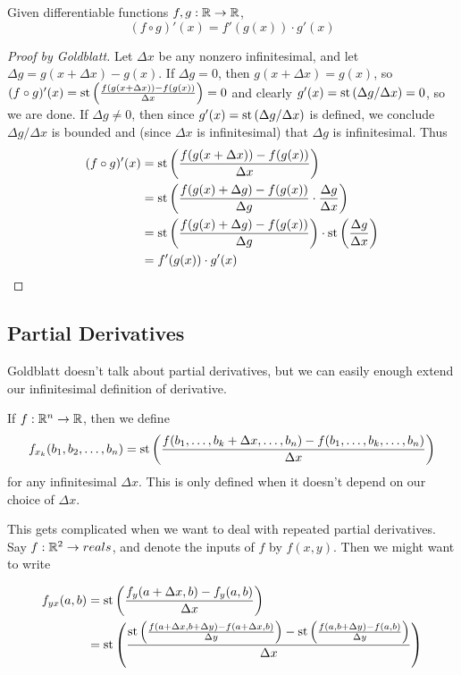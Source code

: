 \begin{thm}\label{ChainRule}
    Given differentiable functions $f, g: \mathbb{R} \to \mathbb{R}$, 
    \[(f \circ g)'(x) = f'(g(x)) \cdot g'(x)\]
\end{thm}

\begin{proof}[Proof by Goldblatt]
    Let $\Delta x$ be any nonzero infinitesimal, and let $\Delta g = g(x + \Delta x) - g(x)$. If $\Delta g = 0$, then $g(x + \Delta x) = g(x)$, so $(f \circ g)'(x) = \operatorname{st}\left(\frac{f(g(x + \Delta x)) - f(g(x))}{\Delta x}\right) = 0$ and clearly $g'(x) = \operatorname{st}\left(\Delta g / \Delta x\right) = 0$, so we are done. If $\Delta g \neq 0$, then since $g'(x) = \operatorname{st}\left(\Delta g / \Delta x\right)$ is defined, we conclude $\Delta g / \Delta x$ is bounded and (since $\Delta x$ is infinitesimal) that $\Delta g$ is infinitesimal. Thus
\begin{align*}
    (f \circ g)'(x) &= \operatorname{st}\left(\frac{f(g(x + \Delta x)) - f(g(x))}{\Delta x}\right) \\
        &= \operatorname{st}\left(\frac{f(g(x) + \Delta g) - f(g(x))}{\Delta g} \cdot \frac{\Delta g}{\Delta x}\right) \\
        &= \operatorname{st}\left(\frac{f(g(x) + \Delta g) - f(g(x))}{\Delta g}\right) \cdot \operatorname{st}\left(\frac{\Delta g}{\Delta x}\right) \\
        &= f'(g(x)) \cdot g'(x)
\end{align*}
\end{proof}

\subsection{Partial Derivatives}
Goldblatt doesn't talk about partial derivatives, but we can easily enough extend our infinitesimal definition of derivative.

\begin{defn}
    If $f: \mathbb{R}^n \to \mathbb{R}$, then we define
    \[f_{x_k}(b_1, b_2, \ldots, b_n) = \operatorname{st}\left(\frac{f(b_1, \ldots, b_k + \Delta x, \ldots, b_n) - f(b_1, \ldots, b_k, \ldots, b_n)}{\Delta x}\right) \]
    for any infinitesimal $\Delta x$. This is only defined when it doesn't depend on our choice of $\Delta x$.
\end{defn}

This gets complicated when we want to deal with repeated partial derivatives. Say $f: \mathbb{R}^2 \to reals$, and denote the inputs of $f$ by $f(x, y)$. Then we might want to write

\begin{align*}
    f_{yx}(a, b) &= \operatorname{st}\left(\frac{f_y(a + \Delta x, b) - f_y(a, b)}{\Delta x}\right) \\
        &= \operatorname{st}\left(\frac{\operatorname{st}\left(\frac{f(a + \Delta x, b + \Delta y) - f(a + \Delta x, b)}{\Delta y}\right) - \operatorname{st}\left(\frac{f(a, b + \Delta y) - f(a, b)}{\Delta y}\right)}{\Delta x}\right)
\end{align*}

